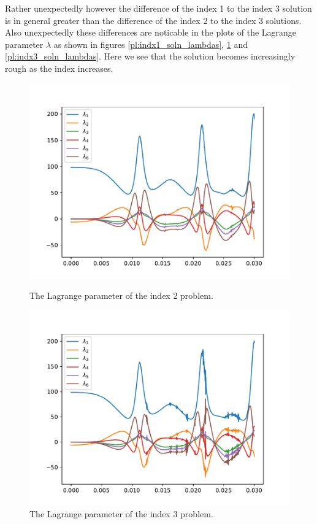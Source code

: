 \documentclass{report}
\begin{document}
Rather unexpectedly however the difference of the index 1 to the index 3 solution is in general greater than the difference of the index 2 to the index 3 solutions. Also unexpectedly these differences are noticable in the plots of the Lagrange parameter $\lambda$ as shown in figures \ref{pl:indx1_soln_lambdas}, \ref{pl:indx2_soln_lambdas} and \ref{pl:indx3_soln_lambdas}. Here we see that the solution becomes increasingly rough as the index increases.


\begin{figure}[h]
\centering
\begin{minipage}[t]{0.45\textwidth}
\centering
\includegraphics[width=\textwidth]{../Plots/Project2_main/Figure_515}
\caption{The Lagrange parameter of the index 2 problem.}
\label{pl:indx1_soln_lambdas}
\end{minipage}
\hfill
\begin{minipage}[t]{0.45\textwidth}
\centering
\includegraphics[width=\textwidth]{../Plots/Project2_main/Figure_518}
\caption{The Lagrange parameter of the index 3 problem.}
\label{pl:indx2_soln_lambdas}
\end{minipage}
\end{figure}
\end{document}
